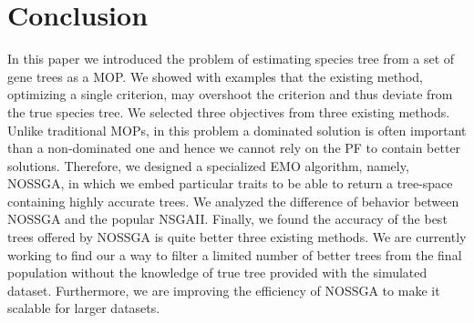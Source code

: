 \section{Conclusion}
In this paper we introduced the problem of estimating species tree from a set of gene trees as a MOP. We showed with examples that the existing method, optimizing a single criterion, may overshoot the criterion and thus deviate from the true species tree. We selected three objectives from three existing methods. Unlike traditional MOPs, in this problem a dominated solution is often important than a non-dominated one and hence we cannot rely on the PF to contain better solutions. Therefore, we designed a specialized EMO algorithm, namely, NOSSGA, in which we embed particular traits to be able to return a tree-space containing highly accurate trees. We analyzed the difference of behavior between NOSSGA and the popular NSGAII. Finally, we found the accuracy of the best trees offered by NOSSGA is quite better three existing methods. We are currently working to find our a way to filter a limited number of better trees from the final population without the knowledge of true tree provided with the simulated dataset. Furthermore, we are improving the efficiency of NOSSGA to make it scalable for larger datasets. 